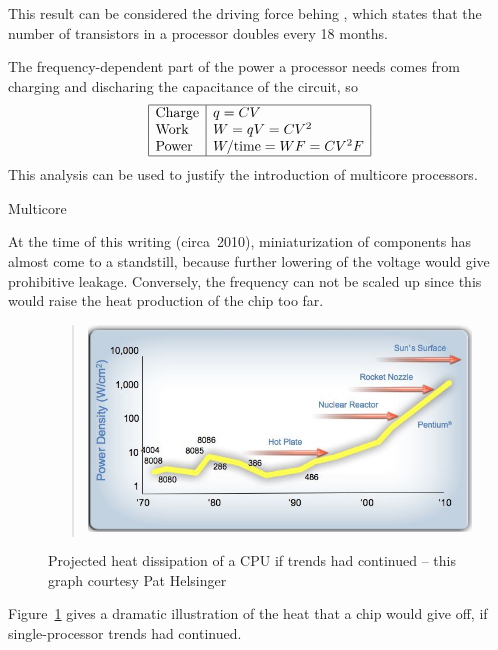 This result can be considered
the driving force behing , which states that the number of transistors in a processor
doubles every 18 months.

The frequency-dependent part of the power a processor needs
comes from charging and discharing the capacitance of the circuit, so
\begin{equation}
\begin{array}{|l|l|} \hline
\hbox{Charge}&q=CV\\
\hbox{Work}&W=qV=CV^2\\
\hbox{Power}&W/\hbox{time}=WF=CV^2F \\ \hline
\end{array}
\label{eq:power}
\end{equation}
This analysis can be used to justify the introduction of multicore processors.

 {Multicore}

At the time of this writing (circa~2010), miniaturization of
components has almost come to a standstill, because further lowering
of the voltage would give prohibitive leakage. Conversely, the
frequency can not be scaled up since this would raise the heat
production of the chip too far. 
%
\begin{figure}[ht]
  \begin{quote}
  \includegraphics[scale=.6]{graphics/chipheat0}
  \end{quote}
  \caption{Projected heat dissipation of a CPU if trends had
    continued -- this graph courtesy Pat Helsinger}
  \label{fig:chipheat}
\end{figure}
%
Figure~\ref{fig:chipheat} gives a dramatic illustration of the heat
that a chip would give off, if single-processor trends had
continued.

